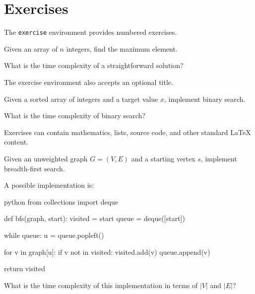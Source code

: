 \documentclass{csdept}
\begin{document}
\section{Exercises}

The \texttt{exercise} environment provides numbered exercises.

\begin{exercise}

Given an array of $n$ integers, find the maximum element.

What is the time complexity of a straightforward solution?

\end{exercise}

The exercise environment also accepts an optional title.

\begin{exercise}

Given a sorted array of integers and a target value $x$,
implement binary search.

What is the time complexity of binary search?

\end{exercise}

Exercises can contain mathematics, lists, source code,
and other standard LaTeX content.

\begin{exercise}

Given an unweighted graph $G=(V,E)$ and a starting vertex $s$,
implement breadth-first search.

A possible implementation is:

\begin{code}{python}
from collections import deque

def bfs(graph, start):
    visited = {start}
    queue = deque([start])

    while queue:
        u = queue.popleft()

        for v in graph[u]:
            if v not in visited:
                visited.add(v)
                queue.append(v)

    return visited
\end{code}

What is the time complexity of this implementation in terms of
$|V|$ and $|E|$?

\end{exercise}

\newpage
\end{document}
